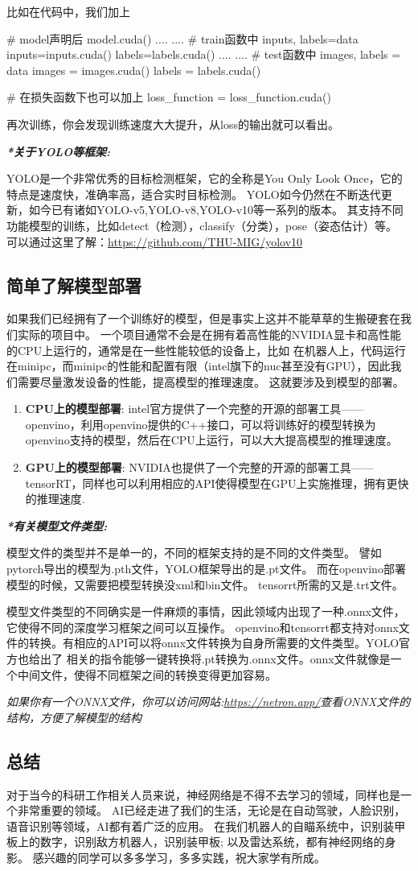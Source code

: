 比如在代码中，我们加上
\begin{tpython}
    # model声明后
    model.cuda()
    ....
    ....
    # train函数中
    inputs, labels=data
    inputs=inputs.cuda()
    labels=labels.cuda()
    ....
    ....
    # test函数中
    images, labels = data
    images = images.cuda()
    labels = labels.cuda()
    
    # 在损失函数下也可以加上
    loss_function = loss_function.cuda()
\end{tpython}
再次训练，你会发现训练速度大大提升，从loss的输出就可以看出。

\textbf{\textit{*关于YOLO等框架:}}

YOLO是一个非常优秀的目标检测框架，它的全称是You Only Look Once，它的特点是速度快，准确率高，适合实时目标检测。
YOLO如今仍然在不断迭代更新，如今已有诸如YOLO-v5,YOLO-v8,YOLO-v10等一系列的版本。
其支持不同功能模型的训练，比如detect（检测），classify（分类），pose（姿态估计）等。
可以通过这里了解：\url{https://github.com/THU-MIG/yolov10}

\subsection{简单了解模型部署}
如果我们已经拥有了一个训练好的模型，但是事实上这并不能草草的生搬硬套在我们实际的项目中。
一个项目通常不会是在拥有着高性能的NVIDIA显卡和高性能的CPU上运行的，通常是在一些性能较低的设备上，比如
在机器人上，代码运行在minipc，而minipc的性能和配置有限（intel旗下的nuc甚至没有GPU），因此我们需要尽量激发设备的性能，提高模型的推理速度。
这就要涉及到模型的部署。

\begin{enumerate}
    \item \textbf{CPU上的模型部署}: intel官方提供了一个完整的开源的部署工具——openvino，利用openvino提供的C++接口，可以将训练好的模型转换为openvino支持的模型，然后在CPU上运行，可以大大提高模型的推理速度。
    \item \textbf{GPU上的模型部署}: NVIDIA也提供了一个完整的开源的部署工具——tensorRT，同样也可以利用相应的API使得模型在GPU上实施推理，拥有更快的推理速度.
\end{enumerate}

\textbf{\textit{*有关模型文件类型:}}

模型文件的类型并不是单一的，不同的框架支持的是不同的文件类型。
譬如pytorch导出的模型为.pth文件，YOLO框架导出的是.pt文件。
而在openvino部署模型的时候，又需要把模型转换没xml和bin文件。
tensorrt所需的又是.trt文件。

模型文件类型的不同确实是一件麻烦的事情，因此领域内出现了一种.onnx文件，它使得不同的深度学习框架之间可以互操作。
openvino和tensorrt都支持对onnx文件的转换。有相应的API可以将onnx文件转换为自身所需要的文件类型。YOLO官方也给出了
相关的指令能够一键转换将.pt转换为.onnx文件。onnx文件就像是一个中间文件，使得不同框架之间的转换变得更加容易。

\textit{如果你有一个ONNX文件，你可以访问网站:\url{https://netron.app/}查看ONNX文件的结构，方便了解模型的结构}

\subsection{总结}
对于当今的科研工作相关人员来说，神经网络是不得不去学习的领域，同样也是一个非常重要的领域。
AI已经走进了我们的生活，无论是在自动驾驶，人脸识别，语音识别等领域，AI都有着广泛的应用。
在我们机器人的自瞄系统中，识别装甲板上的数字，识别敌方机器人，识别装甲板; 以及雷达系统，都有神经网络的身影。
感兴趣的同学可以多多学习，多多实践，祝大家学有所成。